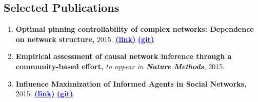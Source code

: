 \documentclass[letter]{res}
\begin{document}
\begin{resume}
\section{Selected Publications}
\begin{enumerate}[leftmargin=-.01in]
\item \textbf{Optimal pinning controllability of complex networks: Dependence on network structure,} 2015.
\href{http://link.aps.org/doi/10.1103/PhysRevE.91.012803}{\textbf{\textcolor{blue}{(link)}}}
{\href{https://github.com/omid55/optimal_pinning_control}{\textbf{\textcolor{blue}{(git)}}}}

\item \textbf{Empirical assessment of causal network inference through a community-based effort,} \textit{to appear in \textbf{Nature Methods}}, 2015.

\item \textbf{Influence Maximization of Informed Agents in Social Networks,} 2015.
{\href{http://dx.doi.org/10.1016/j.amc.2014.12.139}{\textbf{\textcolor{blue}{(link)}}}}
{\href{https://github.com/omid55/influence_maximization}{\textbf{\textcolor{blue}{(git)}}}}


\end{enumerate}
\end{resume}
\end{document}
